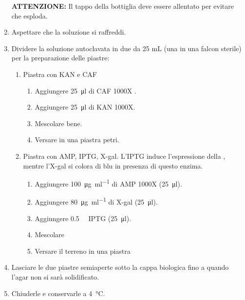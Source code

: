 \begin{enumerate}
	\textbf{ATTENZIONE:} Il tappo della bottiglia deve essere allentato per evitare che esploda. 
	\item Aspettare che la soluzione si raffreddi.
	\item Dividere la soluzione autoclavata in due da 25 mL (una in una falcon sterile) per la preparazione delle piastre:
	\begin{enumerate}[label=\Alph*)]
		\item Piastra con \ac{KAN} e \ac{CAF}
		\begin{enumerate}[label=\arabic*.]
			\item Aggiungere \qty{25}{\micro\litre} di \acs{CAF} 1000X .			
			\item Aggiungere \qty{25}{\micro\litre} di \acs{KAN} 1000X.			
			\item Mescolare bene.			
			\item Versare in una piastra petri.
		\end{enumerate}
		\item Piastra con \ac{AMP}, \acs{IPTG}, \acs{X-gal}. L’IPTG induce l’espressione della , mentre l’\acs{X-gal} si colora di blu in presenza di questo enzima.
		\begin{enumerate}[label=\arabic*.]
			\item Aggiungere \qty{100}{\ug\per\ml} di \acl{AMP} 1000X (\qty{25}{\micro\litre}).			
			\item Aggiungere \qty{80}{\ug\per\ml} di \acs{X-gal} (\qty{25}{\micro\litre}).			
			\item Aggiungere \qty{0.5}{\milli\Molar} \acs{IPTG} (\qty{25}{\micro\litre}).			
			\item Mescolare 			
			\item Versare il terreno in una piastra
		\end{enumerate}
	\end{enumerate}
	\item Lasciare le due piastre semiaperte sotto la cappa biologica fino a quando l’agar non si sarà solidificato.
	\item Chiuderle e conservarle a \qty{4}{\celsius}.
\end{enumerate}

